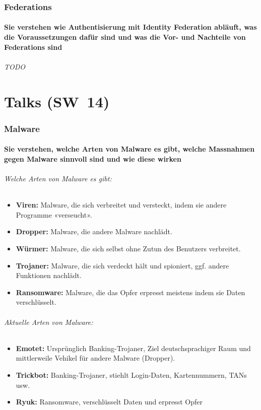 \documentclass[10pt,a4paper]{article}
\begin{document}
\section{Federations}
\subsection*{Sie verstehen wie Authentisierung mit Identity Federation abläuft, was die Voraussetzungen dafür sind und was die Vor- und Nachteile von Federations sind}
\paragraph*{TODO}


\part{Talks (SW~14)}
\section{Malware}
\subsection*{Sie verstehen, welche Arten von Malware es gibt, welche Massnahmen gegen Malware sinnvoll sind und wie diese wirken}
\paragraph*{Welche Arten von Malware es gibt:}
\begin{itemize}[noitemsep,topsep=0pt,leftmargin=*]
    \item \textbf{Viren:} Malware, die sich verbreitet und versteckt, indem sie andere Programme «verseucht».
    \item \textbf{Dropper:} Malware, die andere Malware nachlädt.
    \item \textbf{Würmer:} Malware, die sich selbst ohne Zutun des Benutzers verbreitet.
    \item \textbf{Trojaner:} Malware, die sich verdeckt hält und spioniert, ggf. andere Funktionen nachlädt.
    \item \textbf{Ransomware:} Malware, die das Opfer erpresst meistens indem sie Daten verschlüsselt.
\end{itemize}
\paragraph*{Aktuelle Arten von Malware:}
\begin{itemize}[noitemsep,topsep=0pt,leftmargin=*]
    \item \textbf{Emotet:} Ursprünglich Banking-Trojaner, Ziel deutschsprachiger Raum und mittlerweile Vehikel für andere Malware (Dropper).
    \item \textbf{Trickbot:} Banking-Trojaner, stiehlt Login-Daten, Kartennummern, TANs usw.
    \item \textbf{Ryuk:} Ransomware, verschlüsselt Daten und erpresst Opfer
\end{itemize}
\end{document}
